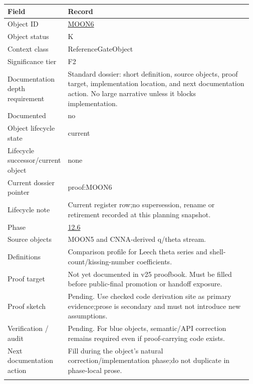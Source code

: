 \begin{longtable}{L{0.16\linewidth} L{0.81\linewidth}}
\hline
\textbf{Field} & \textbf{Record}\\
\hline
Object ID & \hyperlink{object-row-MOON6}{MOON6}\\
\hline\addlinespace[0.20em]
Object status & K\\
\hline\addlinespace[0.20em]
Context class & ReferenceGateObject\\
\hline\addlinespace[0.20em]
Significance tier & F2\\
\hline\addlinespace[0.20em]
Documentation depth requirement & Standard dossier: short definition, source objects, proof target, implementation location, and next documentation action. No large narrative unless it blocks implementation.\\
\hline\addlinespace[0.20em]
Documented & no\\
\hline\addlinespace[0.20em]
Object lifecycle state & current\\
\hline\addlinespace[0.20em]
Lifecycle successor/\allowbreak{}current object & none\\
\hline\addlinespace[0.20em]
Current dossier pointer & proof:MOON6\\
\hline\addlinespace[0.20em]
Lifecycle note & Current register row;\newline no supersession, rename or retirement recorded at this planning snapshot.\\
\hline\addlinespace[0.20em]
Phase & \hyperlink{phase-row-12-6}{12.6}\\
\hline\addlinespace[0.20em]
Source objects & MOON5 and CNNA-derived q/\allowbreak{}theta stream.\\
\hline\addlinespace[0.20em]
Definitions & Comparison profile for Leech theta series and shell-count/\allowbreak{}kissing-number coefficients.\\
\hline\addlinespace[0.20em]
Proof target & Not yet documented in v25 proofbook. Must be filled before public-final promotion or handoff exposure.\\
\hline\addlinespace[0.20em]
Proof sketch & Pending. Use checked code derivation site as primary evidence;\newline prose is secondary and must not introduce new assumptions.\\
\hline\addlinespace[0.20em]
Verification /\allowbreak{} audit & Pending. For blue objects, semantic/\allowbreak{}API correction remains required even if proof-carrying code exists.\\
\hline\addlinespace[0.20em]
Next documentation action & Fill during the object's natural correction/\allowbreak{}implementation phase;\newline do not duplicate in phase-local prose.\\
\hline\addlinespace[0.20em]
\end{longtable}
